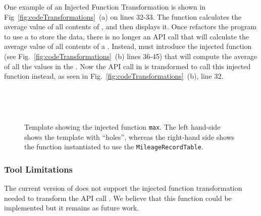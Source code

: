\documentclass[article]{sigplanconf}
\begin{document}
One example of an Injected Function Transformation is shown in Fig~\ref{fig:codeTransformations}~(a) on lines 32-33.
The function  calculates the average value of all contents of , and then displays it. 
Once \tool refactors the program to use a \CDT to store the data, there is no longer an API call that will calculate the average value 
of all contents of a \CDT. Instead, \tool must introduce the injected function  (see Fig.~\ref{fig:codeTransformations}~(b) lines 36-45) that will compute the average of all the values in the .  
Now the API call in  is transformed to call this  injected function instead, as seen in Fig.~\ref{fig:codeTransformations}~(b), line 32.

 \\


\begin{figure}
   \centering
    \mbox{
      \hspace{0.2in}
    }
    \caption{Template showing the injected function \texttt{max}. The left hand-side shows the template with ``holes'', whereas the right-hand side shows the function instantiated to use the \texttt{MileageRecordTable}.}
    \label{fig:MaxCustomTransformationTransformations}
\end{figure}


\subsubsection{Tool Limitations}
The current version of \tool does not support the injected function transformation needed to transform the API call .  We believe that this function could be implemented but it remains as future work. 
\end{document}
